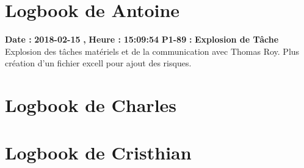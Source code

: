 \documentclass{article}%
\begin{document}
%
\normalsize%
\section{Logbook de Antoine}%
\textbf{Date : }%
\textbf{2018{-}02{-}15}%
\textbf{,}%
\textbf{ Heure : }%
\textbf{15:09:54}%
\newline%
%
\textbf{P1{-}89 }%
\textbf{ : }%
\textbf{ Explosion de Tâche}%
\newline%
\newline%
%
Explosion des tâches matériels et de la communication avec Thomas Roy. Plus création d'un fichier excell pour ajout des risques.\newline%
\newline%
%
\newpage

%
\section{Logbook de Charles}%
\newpage

%
\section{Logbook de Cristhian}%
\newpage

%
\end{document}
